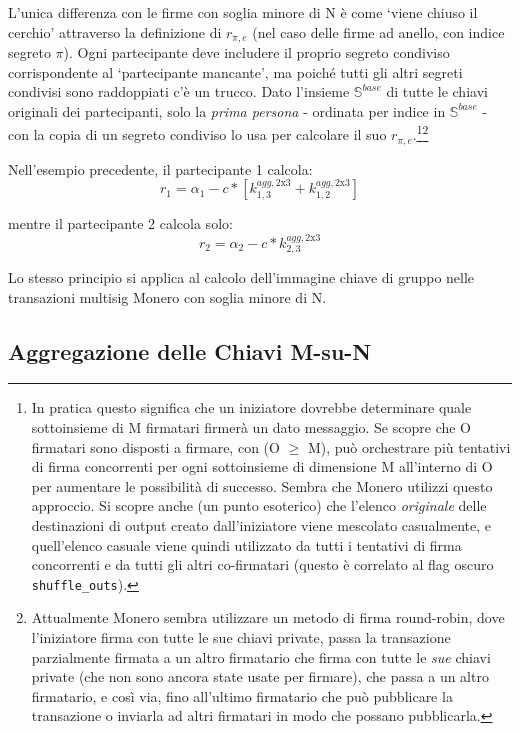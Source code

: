 L'unica differenza con le firme con soglia minore di N è come `viene chiuso il cerchio' attraverso la definizione di $r_{\pi,e}$ (nel caso delle firme ad anello, con indice segreto $\pi$). Ogni partecipante deve includere il proprio segreto condiviso corrispondente al `partecipante mancante', ma poiché tutti gli altri segreti condivisi sono raddoppiati c'è un trucco. Dato l'insieme $\mathbb{S}^{base}$ di tutte le chiavi originali dei partecipanti, solo la \emph{prima persona} - ordinata per indice in $\mathbb{S}^{base}$ - con la copia di un segreto condiviso lo usa per calcolare il suo $r_{\pi,e}$.\footnote{In pratica questo significa che un iniziatore dovrebbe determinare quale sottoinsieme di M firmatari firmerà un dato messaggio. Se scopre che O firmatari sono disposti a firmare, con (O $\geq$ M), può orchestrare più tentativi di firma concorrenti per ogni sottoinsieme di dimensione M all'interno di O per aumentare le possibilità di successo. Sembra che Monero utilizzi questo approccio. Si scopre anche (un punto esoterico) che l'elenco \emph{originale} delle destinazioni di output creato dall'iniziatore viene mescolato casualmente, e quell'elenco casuale viene quindi utilizzato da tutti i tentativi di firma concorrenti e da tutti gli altri co-firmatari (questo è correlato al flag oscuro {\tt shuffle\_outs}).}\footnote{Attualmente Monero sembra utilizzare un metodo di firma round-robin, dove l'iniziatore firma con tutte le sue chiavi private, passa la transazione parzialmente firmata a un altro firmatario che firma con tutte le \emph{sue} chiavi private (che non sono ancora state usate per firmare), che passa a un altro firmatario, e così via, fino all'ultimo firmatario che può pubblicare la transazione o inviarla ad altri firmatari in modo che possano pubblicarla.}

Nell'esempio precedente, il partecipante 1 calcola:\vspace{.175cm}
\[r_1 = \alpha_1 - c*[k^{agg,\textrm{2x3}}_{1,3} + k^{agg,\textrm{2x3}}_{1,2}]\]

mentre il partecipante 2 calcola solo:
\[r_2 = \alpha_2 - c*k^{agg,\textrm{2x3}}_{2,3}\]

Lo stesso principio si applica al calcolo dell'immagine chiave di gruppo nelle transazioni multisig Monero con soglia minore di N.


\subsection{Aggregazione delle Chiavi M-su-N}
\label{sec:m-of-n}

